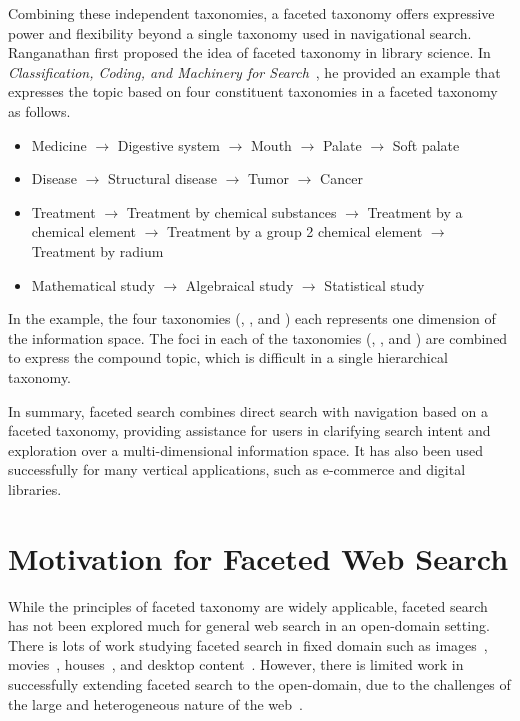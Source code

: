 Combining these independent taxonomies, a faceted taxonomy offers expressive power and flexibility beyond a single taxonomy used in navigational search. Ranganathan
first proposed the idea of faceted taxonomy in library science. In \textit{Classification, Coding, and Machinery for Search}~\cite{ranganathan1950classification}, he provided an example that expresses the topic  based on four constituent taxonomies in a faceted taxonomy as follows.
\begin{itemize}
 \item Medicine $\rightarrow$ Digestive system $\rightarrow$ Mouth $\rightarrow$ Palate $\rightarrow$ Soft palate
\item Disease $\rightarrow$ Structural disease $\rightarrow$ Tumor $\rightarrow$ Cancer
\item Treatment $\rightarrow$ Treatment by chemical substances $\rightarrow$ Treatment by a chemical element  $\rightarrow$ Treatment by a group 2 chemical element $\rightarrow$ Treatment by radium
\item Mathematical study $\rightarrow$ Algebraical study $\rightarrow$ Statistical study
\end{itemize}
In the example, the four taxonomies (, ,  and ) each represents one dimension of the information space. The foci in each of the taxonomies (, ,  and ) are combined to express the compound topic, which is difficult in a single hierarchical taxonomy.



In summary, faceted search combines direct search with navigation based on a faceted taxonomy, providing assistance for users in clarifying search intent and exploration over a multi-dimensional information space. It has also been used successfully for many vertical applications, such as e-commerce and digital libraries. 

\section{Motivation for Faceted Web Search}
\label{sec:intro-motivation}
While the principles of faceted taxonomy are widely applicable, faceted search has not been explored much for general web search in an open-domain setting. There is lots of work studying faceted search in fixed domain such as images~\cite{cutrell2006fast}, movies~\cite{koren2008personalized}, houses~\cite{shneiderman1994dynamic}, and desktop content~\cite{cutrell2006fast}. However, there is limited work in successfully extending faceted search to the open-domain, due to the challenges of the large and heterogeneous nature of the web~\cite{teevan2008challenges}.

